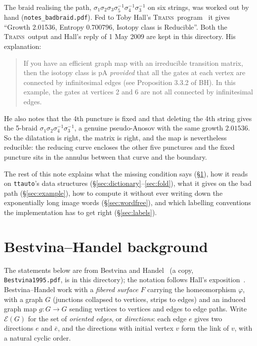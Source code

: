 \documentclass[12pt]{amsart}
\newcommand{\anti}[1]{\bar{#1}}          %
\newcommand{\code}[1]{\texttt{#1}}
\newcommand{\ho}{\varphi}                 %
\newcommand{\dirs}{\mathcal{E}}           %
\newcommand{\Trains}{\textsc{Trains}}
\newcommand{\ttauto}{\texttt{ttauto}}
\theoremstyle{plain}
\theoremstyle{definition}
\begin{document}
The braid realising the path,
$\sigma_1\sigma_2\sigma_3\sigma_5^{-1}\sigma_4^{-1}\sigma_3^{-1}$ on six
strings, was worked out by hand (\code{notes\_badbraid.pdf}).  Fed to Toby
Hall's \Trains\ program~\cite{HallTrain} it gives ``Growth 2.01536, Entropy 0.700796,
Isotopy class is Reducible''.  Both the \Trains\ output and Hall's reply
of 1 May 2009 are kept in this directory.  His explanation:
\begin{quote}
  If you have an efficient graph map with an irreducible transition matrix,
  then the isotopy class is pA \emph{provided} that all the gates at each
  vertex are connected by infinitesimal edges (see Proposition 3.3.2 of
  BH).  In this example, the gates at vertices 2 and 6 are not all
  connected by infinitesimal edges.
\end{quote}
He also notes that the 4th puncture is fixed and that deleting the 4th
string gives the 5-braid $\sigma_1\sigma_2\sigma_4^{-1}\sigma_3^{-1}$, a
genuine pseudo-Anosov with the same growth $2.01536$.  So the dilatation is
right, the matrix is right, and the map is nevertheless reducible: the
reducing curve encloses the other five punctures and the fixed puncture sits
in the annulus between that curve and the boundary.

The rest of this note explains what the missing condition says
(\S\ref{sec:bh}), how it reads on \ttauto's data structures
(\S\ref{sec:dictionary}--\ref{sec:fold}), what it gives on the bad path
(\S\ref{sec:example}), how to compute it without ever writing down the
exponentially long image words (\S\ref{sec:wordfree}), and which labelling
conventions the implementation has to get right (\S\ref{sec:labels}).

\section{Bestvina--Handel background}
\label{sec:bh}

The statements below are from Bestvina and Handel~\cite{Bestvina1995}
(a copy, \code{Bestvina1995.pdf}, is in this directory); the notation
follows Hall's exposition~\cite{HallBHchapter}.  Bestvina--Handel work with
a \emph{fibered surface} $F$ carrying the homeomorphism $\ho$, with a graph
$G$ (junctions collapsed to vertices, strips to edges) and an induced graph
map $g\colon G\to G$ sending vertices to vertices and edges to edge paths.
Write $\dirs(G)$ for the set of \emph{oriented edges}, or
\emph{directions}: each edge $e$ gives two directions $e$ and $\anti e$,
and the directions with initial vertex $v$ form the link of $v$, with a
natural cyclic order.
\end{document}

